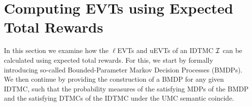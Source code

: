



\section{Computing EVTs using Expected Total Rewards}\label{sec:computing-evts-using-expected-total-rewards}
In this section we examine how the $\ell$EVTs and uEVTs of an IDTMC $\mathcal{I}$ can be calculated using expected total rewards. For this, we start by formally introducing so-called Bounded-Parameter Markov Decision Processes (BMDPs). We then continue by providing the construction of a BMDP for any given IDTMC, such that the probability measures of the satisfying MDPs of the BMDP and the satisfying DTMCs of the IDTMC under the UMC semantic coincide.


